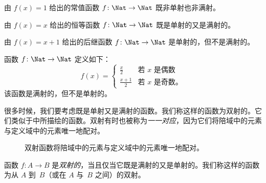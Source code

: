 \documentclass[../../../include/open-logic-section]{subfiles}
\begin{document}
\begin{ex}
由 $f(x) = 1$ 给出的常值函数 $f\colon \Nat \to \Nat$ 既非单射也非满射。

由 $f(x) = x$ 给出的恒等函数 $f\colon \Nat \to \Nat$ 既是单射的又是满射的。

由 $f(x) = x+1$ 给出的后继函数 $f \colon \Nat \to \Nat$ 是单射的，但不是满射的。

函数 $f \colon \Nat \to \Nat$ 定义如下：
\[
  f(x) =
  \begin{cases}
    \frac{x}{2} & \text{若 $x$ 是偶数} \\
    \frac{x+1}{2} & \text{若 $x$ 是奇数。}
  \end{cases}
\]
该函数是满射的，但不是单射的。
\end{ex}

\begin{explain}
很多时候，我们要考虑既是单射又是满射的函数。我们称这样的函数为双射的。它们类似于中所描绘的函数。双射有时也被称为\emph{一一对应}，因为它们将陪域中的元素与定义域中的元素唯一地配对。
\begin{figure}
  \caption{双射函数将陪域中的元素与定义域中的元素唯一地配对。}
\end{figure}
\end{explain}

\begin{defn}[双射]
函数 $f \colon A \to B$ 是\emph{双射的}，当且仅当它既是满射的又是单射的。我们称这样的函数为从 $A$ 到~$B$（或在 $A$ 与~$B$ 之间）的双射。
\end{defn}
\end{document}
